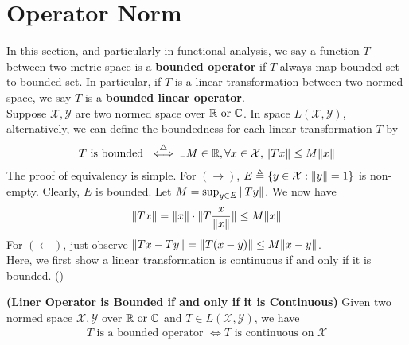 \documentclass{report}
\begin{document}
\section{Operator Norm}
\begin{mdframed}
In this section, and particularly in functional analysis, we say a function $T$ between two metric space is a  \textbf{bounded operator} if $T$ always map bounded set to bounded set. In particular, if $T$ is a linear transformation between two normed space, we say $T$ is a \textbf{bounded linear operator}.\\

Suppose $\mathcal{X},\mathcal{Y}$ are two normed space over $\mathbb{R}\text{ or }\mathbb{C}$. In space $L(\mathcal{X},\mathcal{Y})$, alternatively, we can define the boundedness for each linear transformation $T$ by 
\begin{align*}
T\text{ is bounded } \overset{\triangle}{\iff} \exists M\in\mathbb{R},\forall x\in \mathcal{X}, \| Tx \|\leq M\| x \|
\end{align*}
The proof of equivalency is simple. For $(\longrightarrow )$,  $E\triangleq \{ y \in \mathcal{X}: \| y \|=1 \}$ is non-empty. Clearly, $E$ is bounded. Let $M=\sup_{y\in E} \| Ty \|$. We now have 
\begin{align*}
\| Tx \|= \| x \|\cdot\| T \frac{x}{\| x \|} \|\leq M\| x \|
\end{align*}
For $(\longleftarrow)$, just observe $\| Tx-Ty \|=\| T(x-y) \|\leq M\| x-y \|$.\\


Here, we first show a linear transformation is continuous if and only if it is bounded. () 
\end{mdframed}
\begin{theorem}
\label{LOB}
\textbf{(Liner Operator is Bounded if and only if it is Continuous)} Given two normed space $\mathcal{X},\mathcal{Y}$ over $\mathbb{R}\text{ or }\mathbb{C}$ and  $T\in L(\mathcal{X},\mathcal{Y})$, we have 
\begin{align*}
T\text{ is a bounded operator }\iff T\text{ is continuous on $\mathcal{X}$}
\end{align*}
\end{theorem}
\end{document}
